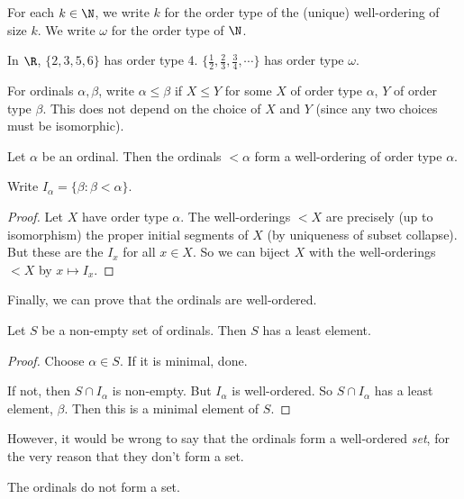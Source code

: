 \documentclass[a4paper]{article}
\begin{document}
\begin{notation}
  For each $k\in \N$, we write $k$ for the order type of the (unique) well-ordering of size $k$. We write $\omega$ for the order type of $\N$.
\end{notation}

\begin{eg}
  In $\R$, $\{2, 3, 5 ,6\}$ has order type 4. $\{\frac{1}{2}, \frac{2}{3}, \frac{3}{4}, \cdots\}$ has order type $\omega$.
\end{eg}

\begin{notation}
  For ordinals $\alpha, \beta$, write $\alpha \leq \beta$ if $X\leq Y$ for some $X$ of order type $\alpha$, $Y$ of order type $\beta$. This does not depend on the choice of $X$ and $Y$ (since any two choices must be isomorphic).
\end{notation}

\begin{prop}
  Let $\alpha$ be an ordinal. Then the ordinals $<\alpha$ form a well-ordering of order type $\alpha$.
\end{prop}

\begin{notation}
  Write $I_\alpha = \{\beta: \beta < \alpha\}$.
\end{notation}

\begin{proof}
  Let $X$ have order type $\alpha$. The well-orderings $< X$ are precisely (up to isomorphism) the proper initial segments of $X$ (by uniqueness of subset collapse). But these are the $I_x$ for all $x\in X$. So we can biject $X$ with the well-orderings $< X$ by $x\mapsto I_x$.
\end{proof}

Finally, we can prove that the ordinals are well-ordered.
\begin{prop}
  Let $S$ be a non-empty set of ordinals. Then $S$ has a least element.
\end{prop}

\begin{proof}
  Choose $\alpha\in S$. If it is minimal, done.

  If not, then $S\cap I_\alpha$ is non-empty. But $I_\alpha$ is well-ordered. So $S\cap I_\alpha$ has a least element, $\beta$. Then this is a minimal element of $S$.
\end{proof}

However, it would be wrong to say that the ordinals form a well-ordered \emph{set}, for the very reason that they don't form a set.
\begin{thm}
  The ordinals do not form a set.
\end{thm}
\end{document}

